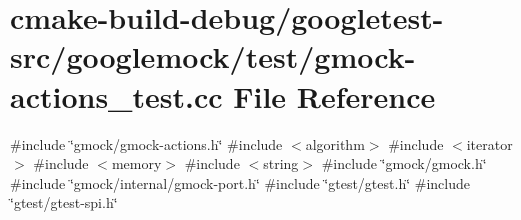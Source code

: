 \hypertarget{gmock-actions__test_8cc}{}\section{cmake-\/build-\/debug/googletest-\/src/googlemock/test/gmock-\/actions\+\_\+test.cc File Reference}
\label{gmock-actions__test_8cc}
{\ttfamily \#include \char`\"{}gmock/gmock-\/actions.\+h\char`\"{}}\newline
{\ttfamily \#include $<$algorithm$>$}\newline
{\ttfamily \#include $<$iterator$>$}\newline
{\ttfamily \#include $<$memory$>$}\newline
{\ttfamily \#include $<$string$>$}\newline
{\ttfamily \#include \char`\"{}gmock/gmock.\+h\char`\"{}}\newline
{\ttfamily \#include \char`\"{}gmock/internal/gmock-\/port.\+h\char`\"{}}\newline
{\ttfamily \#include \char`\"{}gtest/gtest.\+h\char`\"{}}\newline
{\ttfamily \#include \char`\"{}gtest/gtest-\/spi.\+h\char`\"{}}\newline
